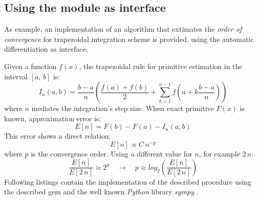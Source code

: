 \subsection{Using the module as interface}
As example, an implementation of an algorithm that extimates the \emph{order of convergence} for trapezoidal integration scheme \cite{weideman2002numerical} is provided, using the automatic differentiation as interface.

Given a function $f(x)$, the trapezoidal rule for primitive estimation in the interval $[a,\,b]$ is:
\begin{equation}
  I_{n}(a, b) = \dfrac{b - a}{n} \left( \dfrac{f(a) + f(b)}{2} +
    \sum\limits_{k = 1}^{n - 1}{f \left( a + k \dfrac{b - a}{n} \right)} \right)
\end{equation}
where $n$ mediates the integration's step size. When exact primitive $F(x)$ is known, approximation error is:
\begin{equation}
  E[n] = F(b) - F(a) - I_{n}(a, b)
\end{equation}
This error shows a direct relation:
\begin{equation}
  E[n] \propto C\,{n}^{-p}
\end{equation}
where $p$ is the convergence order. Using a different value for $n$, for example $2\,n$:
\begin{equation}
  \dfrac{E[n]}{E[2\,n]} \approx 2^{p} \quad \rightarrow \quad p \approx log_2 \left( \dfrac{E[n]}{E[2\,n]} \right)
\end{equation}
Following listings contain the implementation of the described procedure using the described gem and the well known \emph{Python} \cite{van2011python} library \emph{sympy} \cite{christopher_smith_2016_47274}.

\noindent%
  \begin{minipage}{.5\textwidth}
    
  \end{minipage}\hfill
  \begin{minipage}{.5\textwidth}
    
  \end{minipage}
